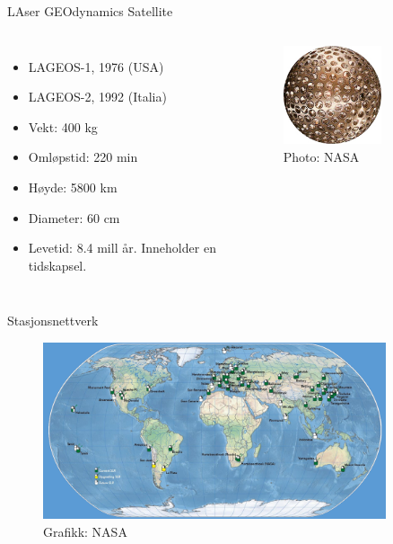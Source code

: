 \documentclass[12pt,table,t]{beamer}
\begin{document}
\begin{frame}{LAser GEOdynamics Satellite}
  \begin{columns}
      \begin{itemize}
        \item LAGEOS-1, 1976 (USA)
        \item LAGEOS-2, 1992 (Italia)
        \item Vekt: 400 kg
        \item Omløpstid: 220 min
        \item Høyde: 5800 km
        \item Diameter: 60 cm
        \item Levetid: 8.4 mill år. Inneholder en tidskapsel. 
      \end{itemize}
      \begin{figure}
        \includegraphics[width=0.7\textwidth]{figure/lageos_1.jpg} \caption{Photo: NASA}
      \end{figure}
  \end{columns}
\end{frame}


\begin{frame}{Stasjonsnettverk}
  \begin{figure}
    \includegraphics[width=0.9\textwidth]{figure/slrmap.png}\caption{Grafikk: NASA}
  \end{figure}
\end{frame}
\end{document}
